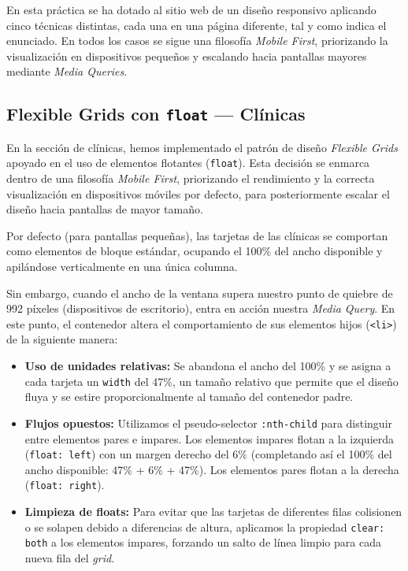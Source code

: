 \documentclass[11pt]{article}
\begin{document}
En esta práctica se ha dotado al sitio web de un diseño responsivo aplicando cinco técnicas distintas, cada una en una página diferente, tal y como indica el enunciado. En todos los casos se sigue una filosofía \textit{Mobile First}, priorizando la visualización en dispositivos pequeños y escalando hacia pantallas mayores mediante \textit{Media Queries}.

\subsection{Flexible Grids con \texttt{float} --- Clínicas}

En la sección de clínicas, hemos implementado el patrón de diseño \textit{Flexible Grids} apoyado en el uso de elementos flotantes (\texttt{float}). Esta decisión se enmarca dentro de una filosofía \textit{Mobile First}, priorizando el rendimiento y la correcta visualización en dispositivos móviles por defecto, para posteriormente escalar el diseño hacia pantallas de mayor tamaño.

Por defecto (para pantallas pequeñas), las tarjetas de las clínicas se comportan como elementos de bloque estándar, ocupando el 100\% del ancho disponible y apilándose verticalmente en una única columna.

Sin embargo, cuando el ancho de la ventana supera nuestro punto de quiebre de 992 píxeles (dispositivos de escritorio), entra en acción nuestra \textit{Media Query}. En este punto, el contenedor altera el comportamiento de sus elementos hijos (\texttt{<li>}) de la siguiente manera:

\begin{itemize}
\item \textbf{Uso de unidades relativas:} Se abandona el ancho del 100\% y se asigna a cada tarjeta un \texttt{width} del 47\%, un tamaño relativo que permite que el diseño fluya y se estire proporcionalmente al tamaño del contenedor padre.
\item \textbf{Flujos opuestos:} Utilizamos el pseudo-selector \texttt{:nth-child} para distinguir entre elementos pares e impares. Los elementos impares flotan a la izquierda (\texttt{float: left}) con un margen derecho del 6\% (completando así el 100\% del ancho disponible: 47\% + 6\% + 47\%). Los elementos pares flotan a la derecha (\texttt{float: right}).
\item \textbf{Limpieza de floats:} Para evitar que las tarjetas de diferentes filas colisionen o se solapen debido a diferencias de altura, aplicamos la propiedad \texttt{clear: both} a los elementos impares, forzando un salto de línea limpio para cada nueva fila del \textit{grid}.
\end{itemize}
\end{document}
